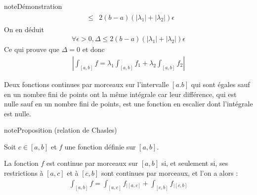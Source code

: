 \documentclass[letterpaper,10pt,french]{sphinxmanual}
\begin{document}
\begin{sphinxadmonition}{note}{Démonstration}
\begin{equation*}
\begin{split}
\begin{aligned}
& \leq & 2(b-a)(|\lambda_1|+|\lambda_2|)\epsilon
\end{aligned}
\end{split}
\end{equation*}
\sphinxAtStartPar
On en déduit
\begin{equation*}
\begin{split}
\forall \epsilon >0, \Delta \leq 2(b-a)(|\lambda_1|+|\lambda_2|)\epsilon
\end{split}
\end{equation*}
\sphinxAtStartPar
Ce qui prouve que \(\Delta =0\) et donc
\begin{equation*}
\begin{split}
 \left|\int_{[a, b]} f = \lambda_1\int_{[a, b]} f_1 +\lambda_2\int_{[a, b]} f_2\right|
\end{split}
\end{equation*}\end{sphinxadmonition}

\sphinxAtStartPar
Deux fonctions continues par morceaux sur l’intervalle \([a. b]\)  qui sont égales sauf en un nombre fini de points ont la même intégrale car leur différence, qui est nulle sauf
en un nombre fini de points, est une fonction en escalier dont l’intégrale est nulle.

\begin{sphinxadmonition}{note}{Proposition (relation de Chasles)}

\sphinxAtStartPar
Soit \(c \in [a, b]\) et \(f\) une fonction définie sur \([a, b]\).

\sphinxAtStartPar
La fonction \(f\) est continue par morceaux sur \([a, b]\) si, et seulement si, ses
restrictions à \([a, c]\) et à \([c, b]\) sont continues par morceaux, et l’on a alors :
\begin{equation*}
\begin{split}
\int_{[a, b]} f = \int_{[a, c]} f_{|[a, c]}  + \int_{[c, b]} f_{|[c, b]}
\end{split}
\end{equation*}\end{sphinxadmonition}
\end{document}
